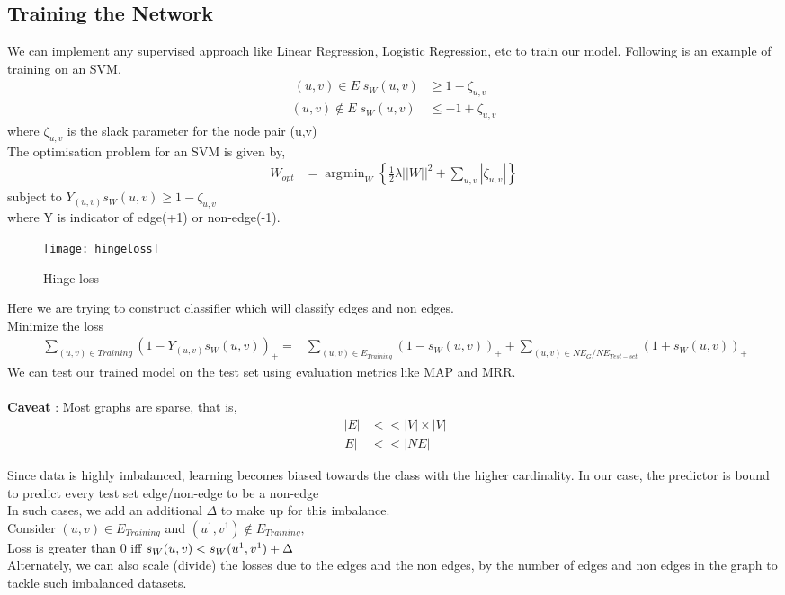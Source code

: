 \documentclass{article}
\DeclareMathOperator*{\argmin}{\arg\!\min}
\begin{document}
\subsection{Training the Network}
We can implement any supervised approach like Linear Regression, Logistic Regression, etc to train our model. Following is an example of training on an SVM.\\
\begin{align} \
(u, v) \in E \;   s_W(u, v ) &\geq 1 - \zeta_{u, v} \\
(u, v) \notin E  \;  s_W(u, v ) &\leq -1 + \zeta_{u, v}
\end{align}
where $\zeta_{u, v}$ is the slack parameter for the node pair (u,v) \\
The optimisation problem for an SVM is given by,
\begin{align}
W_{opt} &= \argmin_W \left\{\frac{1}{2} \lambda ||W||^2 + \sum_{u,v}|\zeta_{u,v}|\right\} 
\end{align}
\hfill subject to $Y_{(u, v)}  s_W(u, v ) \geq 1 - \zeta_{u, v}$ \\
where Y is indicator of edge(+1) or non-edge(-1). \\
\begin{figure}[H]
    \centering
    \texttt{[image: hingeloss]}
    \caption{Hinge loss}
    \label{fig:hingeloss}
\end{figure}
Here we are trying to construct classifier which will classify edges and non edges.\\
Minimize the loss 
\begin{align} \
\sum_{(u,v) \in {Training}}(1 - Y_{(u, v)}  s_W(u, v ))_+  =
&\sum_{(u,v) \in E_{Training}}(1 -  s_W(u, v ))_+  +
\sum_{(u,v) \in  NE_{G}/NE_{Test-set}}(1 +  s_W(u, v ))_+ 
\end{align}
We can test our trained model on the test set using evaluation metrics like MAP and MRR.\\ \\
\noindent \textbf{Caveat} : Most graphs are sparse, that is,
\begin{align} \
|E| &<< |V| \times |V| \\
|E| &<< |NE|
\end{align}

\noindent Since data is highly imbalanced, learning becomes biased towards the class with the higher cardinality. In our case, the predictor is bound to predict every test set edge/non-edge to be a non-edge \\ In such cases, we add an additional $\Delta$ to make up for this imbalance. \\
Consider $(u, v) \in E_{Training} $ and  $  (u^1, v^1) \notin E_{Training},$ \\
Loss is greater than 0 iff $ s_{W}(u, v)  <  s_{W}(u^1, v^1)  + \Delta \\$ \\
Alternately, we can also scale (divide) the losses due to the edges and the non edges, by the number of edges and non edges in the graph to tackle such imbalanced datasets.
\end{document}
